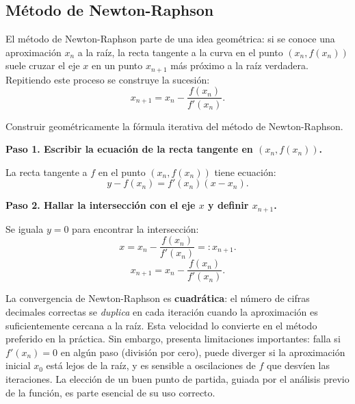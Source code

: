 \subsection{Método de Newton-Raphson}

El método de Newton-Raphson parte de una idea geométrica: si se conoce
una aproximación $x_n$ a la raíz, la recta tangente a la curva en el
punto $(x_n, f(x_n))$ suele cruzar el eje $x$ en un punto $x_{n+1}$
más próximo a la raíz verdadera. Repitiendo este proceso se construye
la sucesión:
\[
x_{n+1} = x_n - \frac{f(x_n)}{f'(x_n)}.
\]
\begin{example}
Construir geométricamente la fórmula iterativa del método de Newton-Raphson.
\begin{myproof}
\textbf{Paso 1. Escribir la ecuación de la recta tangente en $(x_n,f(x_n))$.}

La recta tangente a $f$ en el punto $(x_n,f(x_n))$ tiene ecuación:
\[
y - f(x_n) = f'(x_n)(x - x_n).
\]

\textbf{Paso 2. Hallar la intersección con el eje $x$ y definir $x_{n+1}$.}

Se iguala $y=0$ para encontrar la intersección:
\[
x = x_n - \frac{f(x_n)}{f'(x_n)} =: x_{n+1}.
\]
\[
\boxed{x_{n+1} = x_n - \frac{f(x_n)}{f'(x_n)}.}
\]
\end{myproof}
\end{example}
La convergencia de Newton-Raphson es \textbf{cuadrática}: el número de
cifras decimales correctas se \emph{duplica} en cada iteración cuando
la aproximación es suficientemente cercana a la raíz. Esta velocidad
lo convierte en el método preferido en la práctica. Sin embargo,
presenta limitaciones importantes: falla si $f'(x_n)=0$ en algún paso
(división por cero), puede diverger si la aproximación inicial $x_0$
está lejos de la raíz, y es sensible a oscilaciones de $f$ que desvíen
las iteraciones. La elección de un buen punto de partida, guiada por
el análisis previo de la función, es parte esencial de su uso correcto.

